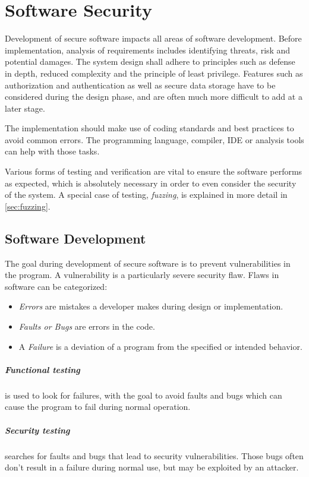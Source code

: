 \chapter{Software Security}
Development of secure software impacts all areas of software development. Before
implementation, analysis of requirements includes identifying threats, risk and
potential damages. The system design shall adhere to principles such as defense
in depth, reduced complexity and the principle of least privilege. Features such
as authorization and authentication as well as secure data  storage have to be
considered during the design phase, and are often much more difficult to add at
a later stage.

The implementation should make use of coding standards and best practices to
avoid common errors. The programming language, compiler, IDE or analysis tools
can help with those tasks.

Various forms of testing and verification are vital to ensure the software
performs as expected, which is absolutely necessary in order to even consider
the security of the system. A special case of testing, \textit{fuzzing}, is
explained in more detail in \cref{sec:fuzzing}.

\section{Software Development}
The goal during development of secure software is to prevent vulnerabilities in
the program. A vulnerability is a particularly severe security flaw. Flaws in
software can be categorized:
\begin{itemize}
    \item \emph{Errors} are mistakes a developer makes during design or
          implementation.
    \item \emph{Faults or Bugs} are errors in the code.
    \item A \emph{Failure} is a deviation of a program from the specified or
          intended behavior.
\end{itemize}

\paragraph{Functional testing} is used to look for failures, with the goal to
avoid faults and bugs which can cause the program to fail during normal
operation.

\paragraph{Security testing} searches for faults and bugs that lead to security
vulnerabilities. Those bugs often don't result in a failure during normal use,
but may be exploited by an attacker.

